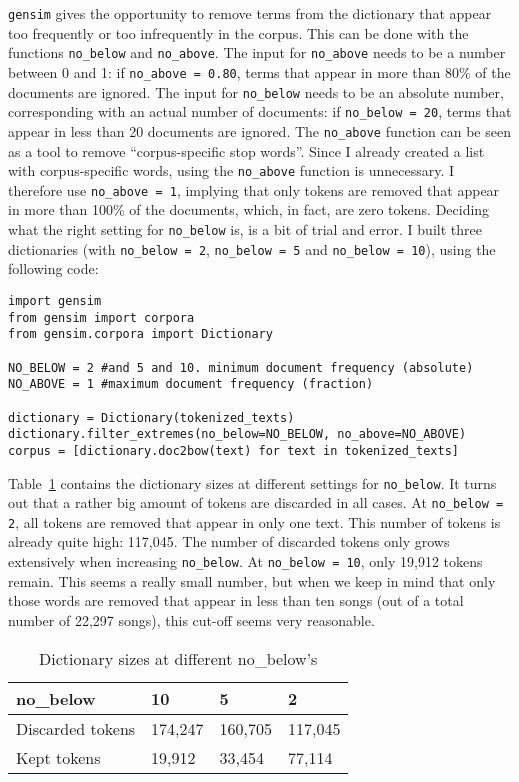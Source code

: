 \texttt{gensim} gives the opportunity to remove terms from the dictionary that appear too frequently or too infrequently in the corpus. This can be done with the functions \texttt{no\_below} and \texttt{no\_above}. The input for \texttt{no\_above} needs to be a number between 0 and 1: if \texttt{no\_above = 0.80}, terms that appear in more than 80\% of the documents are ignored. The input for \texttt{no\_below} needs to be an absolute number, corresponding with an actual number of documents: if \texttt{no\_below = 20}, terms that appear in less than 20 documents are ignored. The \texttt{no\_above} function can be seen as a tool to remove \enquote{corpus-specific stop words}. Since I already created a list with corpus-specific words, using the \texttt{no\_above} function is unnecessary. I therefore use \texttt{no\_above = 1}, implying that only tokens are removed that appear in more than 100\% of the documents, which, in fact, are zero tokens. Deciding what the right setting for \texttt{no\_below} is, is a bit of trial and error. I built three dictionaries (with \texttt{no\_below = 2}, \texttt{no\_below = 5} and \texttt{no\_below = 10}), using the following code:

\begin{lstlisting}
import gensim
from gensim import corpora
from gensim.corpora import Dictionary

NO_BELOW = 2 #and 5 and 10. minimum document frequency (absolute)
NO_ABOVE = 1 #maximum document frequency (fraction)

dictionary = Dictionary(tokenized_texts)
dictionary.filter_extremes(no_below=NO_BELOW, no_above=NO_ABOVE)
corpus = [dictionary.doc2bow(text) for text in tokenized_texts]
\end{lstlisting}

\noindent Table~\ref{table:DictSizesDifferentNB} contains the dictionary sizes at different settings for \texttt{no\_below}. It turns out that a rather big amount of tokens are discarded in all cases. At \texttt{no\_below = 2}, all tokens are removed that appear in only one text. This number of tokens is already quite high: 117,045. The number of discarded tokens only grows extensively when increasing \texttt{no\_below}. At \texttt{no\_below = 10}, only 19,912 tokens remain. This seems a really small number, but when we keep in mind that only those words are removed that appear in less than ten songs (out of a total number of 22,297 songs), this cut-off seems very reasonable.

\begin{table}[]
	\centering
	\begin{tabular}{llll}
		\toprule
		no\_below & 10 & 5 & 2 \\
		\midrule
		Discarded tokens & 174,247                & 160,705                & 117,045                \\
		Kept tokens      & 19,912                 & 33,454                 & 77,114          \\
		\bottomrule      
	\end{tabular}
	\caption{Dictionary sizes at different no\_below's}
	\label{table:DictSizesDifferentNB}
\end{table}

